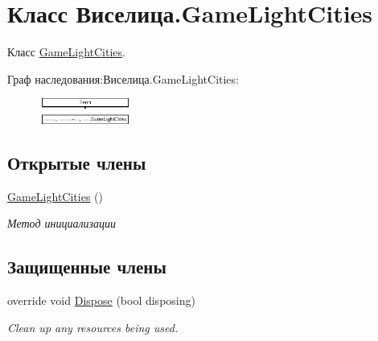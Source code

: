 \hypertarget{class_xD0_x92_xD0_xB8_xD1_x81_xD0_xB5_xD0_xBB_xD0_xB8_xD1_x86_xD0_xB0_1_1_game_light_cities}{\section{Класс Виселица.\+Game\+Light\+Cities}
\label{class_xD0_x92_xD0_xB8_xD1_x81_xD0_xB5_xD0_xBB_xD0_xB8_xD1_x86_xD0_xB0_1_1_game_light_cities}
}


Класс \hyperlink{class_xD0_x92_xD0_xB8_xD1_x81_xD0_xB5_xD0_xBB_xD0_xB8_xD1_x86_xD0_xB0_1_1_game_light_cities}{Game\+Light\+Cities}.  


Граф наследования\+:Виселица.\+Game\+Light\+Cities\+:\begin{figure}[H]
\begin{center}
\leavevmode
\includegraphics[height=0.838951cm]{class_xD0_x92_xD0_xB8_xD1_x81_xD0_xB5_xD0_xBB_xD0_xB8_xD1_x86_xD0_xB0_1_1_game_light_cities}
\end{center}
\end{figure}
\subsection*{Открытые члены}
\begin{DoxyCompactItemize}
\item 
\hyperlink{class_xD0_x92_xD0_xB8_xD1_x81_xD0_xB5_xD0_xBB_xD0_xB8_xD1_x86_xD0_xB0_1_1_game_light_cities_aa96b7308bf950e95d6a1af8f811dbe4b}{Game\+Light\+Cities} ()
\begin{DoxyCompactList}\small\item\em Метод инициализации \end{DoxyCompactList}\end{DoxyCompactItemize}
\subsection*{Защищенные члены}
\begin{DoxyCompactItemize}
\item 
override void \hyperlink{class_xD0_x92_xD0_xB8_xD1_x81_xD0_xB5_xD0_xBB_xD0_xB8_xD1_x86_xD0_xB0_1_1_game_light_cities_a41cb54fc2a796ceb9f08ed76adce0586}{Dispose} (bool disposing)
\begin{DoxyCompactList}\small\item\em Clean up any resources being used. \end{DoxyCompactList}\end{DoxyCompactItemize}


